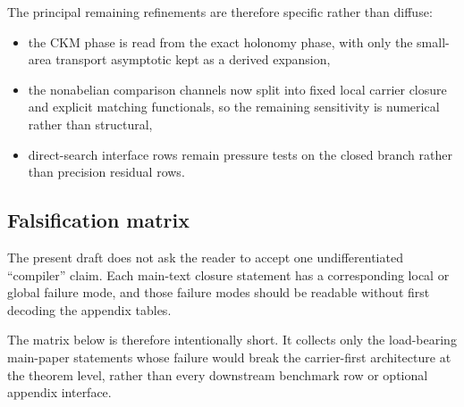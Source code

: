 The principal remaining refinements are therefore specific rather than diffuse:
\begin{itemize}[leftmargin=1.5em, topsep=3pt, itemsep=2pt]
    \item the CKM phase is read from the exact holonomy phase, with only the small-area transport asymptotic kept as a derived expansion,
    \item the nonabelian comparison channels now split into fixed local carrier closure and explicit matching functionals, so the remaining sensitivity is numerical rather than structural,
    \item direct-search interface rows remain pressure tests on the closed branch rather than precision residual rows.
\end{itemize}

\subsection{Falsification matrix}

The present draft does not ask the reader to accept one undifferentiated \enquote{compiler} claim. Each main-text closure statement has a corresponding local or global failure mode, and those failure modes should be readable without first decoding the appendix tables.

The matrix below is therefore intentionally short. It collects only the load-bearing main-paper statements whose failure would break the carrier-first architecture at the theorem level, rather than every downstream benchmark row or optional appendix interface.

